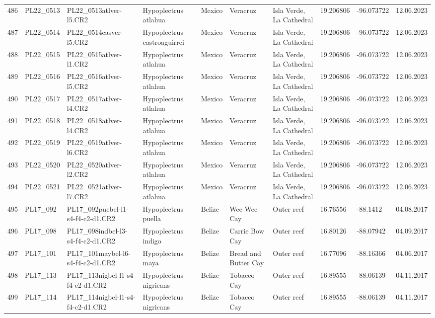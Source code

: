 \begin{table}[ht]
\begin{tabular}{rlllllllll}
  486 & PL22\_0513 & PL22\_0513atlver-l5.CR2 & Hypoplectrus atlahua & Mexico & Veracruz & Isla Verde, La Cathedral & 19.206806 & -96.073722 & 12.06.2023 \\ 
  487 & PL22\_0514 & PL22\_0514casver-l5.CR2 & Hypoplectrus castroaguirrei & Mexico & Veracruz & Isla Verde, La Cathedral & 19.206806 & -96.073722 & 12.06.2023 \\ 
  488 & PL22\_0515 & PL22\_0515atlver-l1.CR2 & Hypoplectrus atlahua & Mexico & Veracruz & Isla Verde, La Cathedral & 19.206806 & -96.073722 & 12.06.2023 \\ 
  489 & PL22\_0516 & PL22\_0516atlver-l5.CR2 & Hypoplectrus atlahua & Mexico & Veracruz & Isla Verde, La Cathedral & 19.206806 & -96.073722 & 12.06.2023 \\ 
  490 & PL22\_0517 & PL22\_0517atlver-l4.CR2 & Hypoplectrus atlahua & Mexico & Veracruz & Isla Verde, La Cathedral & 19.206806 & -96.073722 & 12.06.2023 \\ 
  491 & PL22\_0518 & PL22\_0518atlver-l4.CR2 & Hypoplectrus atlahua & Mexico & Veracruz & Isla Verde, La Cathedral & 19.206806 & -96.073722 & 12.06.2023 \\ 
  492 & PL22\_0519 & PL22\_0519atlver-l6.CR2 & Hypoplectrus atlahua & Mexico & Veracruz & Isla Verde, La Cathedral & 19.206806 & -96.073722 & 12.06.2023 \\ 
  493 & PL22\_0520 & PL22\_0520atlver-l2.CR2 & Hypoplectrus atlahua & Mexico & Veracruz & Isla Verde, La Cathedral & 19.206806 & -96.073722 & 12.06.2023 \\ 
  494 & PL22\_0521 & PL22\_0521atlver-l7.CR2 & Hypoplectrus atlahua & Mexico & Veracruz & Isla Verde, La Cathedral & 19.206806 & -96.073722 & 12.06.2023 \\ 
  495 & PL17\_092 & PL17\_092puebel-l1-s4-f4-c2-d1.CR2 & Hypoplectrus puella & Belize & Wee Wee Cay & Outer reef & 16.76556 & -88.1412 & 04.08.2017 \\ 
  496 & PL17\_098 & PL17\_098indbel-l3-s4-f4-c2-d1.CR2 & Hypoplectrus indigo & Belize & Carrie Bow Cay & Outer reef & 16.80126 & -88.07942 & 04.09.2017 \\ 
  497 & PL17\_101 & PL17\_101maybel-l6-s4-f4-c2-d1.CR2 & Hypoplectrus maya & Belize & Bread and Butter Cay & Outer reef & 16.77096 & -88.16366 & 04.06.2017 \\ 
  498 & PL17\_113 & PL17\_113nigbel-l1-s4-f4-c2-d1.CR2 & Hypoplectrus nigricans & Belize & Tobacco Cay & Outer reef & 16.89555 & -88.06139 & 04.11.2017 \\ 
  499 & PL17\_114 & PL17\_114nigbel-l1-s4-f4-c2-d1.CR2 & Hypoplectrus nigricans & Belize & Tobacco Cay & Outer reef & 16.89555 & -88.06139 & 04.11.2017 \\ 

\end{tabular}
\end{table}
